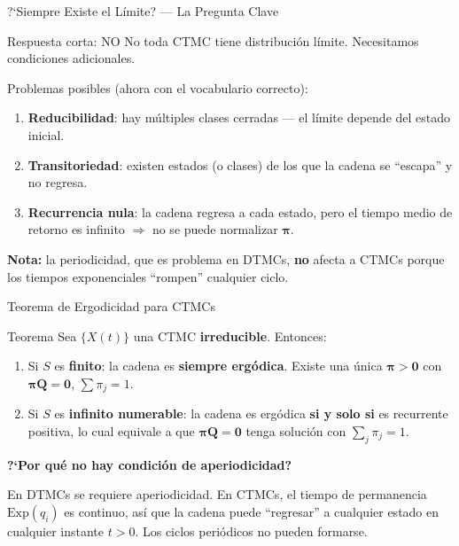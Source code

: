 \documentclass[aspectratio=1610, 10pt]{beamer}
\newcommand{\bpi}{\boldsymbol{\pi}}
\newcommand{\bQ}{\mathbf{Q}}
\begin{document}
\begin{frame}{?`Siempre Existe el L\'{i}mite?{} --- La Pregunta Clave}
  \begin{alertblock}{Respuesta corta: NO}
    No toda CTMC tiene distribuci\'{o}n l\'{i}mite. Necesitamos
    condiciones adicionales.
  \end{alertblock}

  \vspace{4pt}
  Problemas posibles (ahora con el vocabulario correcto):
  \begin{enumerate}
    \item \textbf{Reducibilidad}: hay m\'{u}ltiples clases cerradas ---
          el l\'{i}mite depende del estado inicial.
    \item \textbf{Transitoriedad}: existen estados (o clases) de los que
          la cadena se ``escapa'' y no regresa.
    \item \textbf{Recurrencia nula}: la cadena regresa a cada estado, pero el tiempo medio
          de retorno es infinito $\Rightarrow$ no se puede normalizar $\bpi$.
  \end{enumerate}

  \vspace{4pt}
  \textbf{Nota:} la periodicidad, que es problema en DTMCs, \textbf{no} afecta
  a CTMCs porque los tiempos exponenciales ``rompen'' cualquier ciclo.
\end{frame}

\begin{frame}{Teorema de Ergodicidad para CTMCs}
  \begin{block}{Teorema}
    Sea $\{X(t)\}$ una CTMC \textbf{irreducible}. Entonces:
    \begin{enumerate}
      \item Si $S$ es \textbf{finito}: la cadena es \textbf{siempre erg\'{o}dica}.
            Existe una \'{u}nica $\bpi > \mathbf{0}$ con $\bpi\bQ = \mathbf{0}$,
            $\sum \pi_j = 1$.
      \item Si $S$ es \textbf{infinito numerable}: la cadena es erg\'{o}dica
            \textbf{si y solo si} es recurrente positiva, lo cual equivale a que
            $\bpi\bQ = \mathbf{0}$ tenga soluci\'{o}n con $\sum_j \pi_j = 1$.
    \end{enumerate}
  \end{block}

  \vspace{6pt}
  \textbf{?`Por qu\'{e} no hay condici\'{o}n de aperiodicidad?}

  En DTMCs se requiere aperiodicidad. En CTMCs, el tiempo de permanencia
  $\text{Exp}(q_i)$ es continuo, as\'{i} que la cadena puede ``regresar'' a cualquier
  estado en cualquier instante $t > 0$. Los ciclos peri\'{o}dicos no pueden formarse.
\end{frame}
\end{document}
